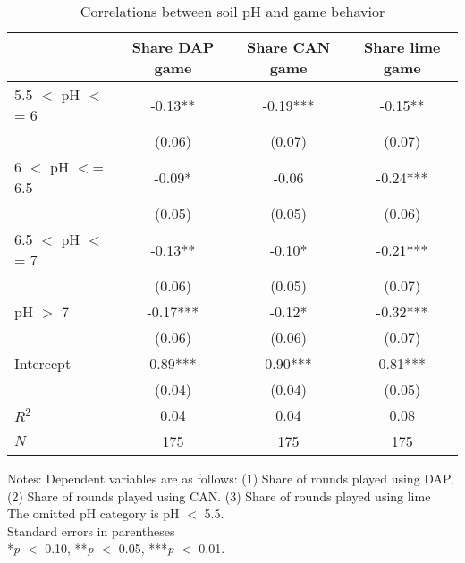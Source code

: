 \begin{table}[htbp]
\centering
\hspace*{-1.2cm}
\begin{threeparttable}
\caption{Correlations between soil pH and game behavior}
\label{tab:games_dapcanlime}
\begin{tabular}{l ccc}
\hline
\hline
                    &Share DAP game   &Share CAN game   &Share lime game   \\
\hline
5.5 $<$ pH $<$= 6       &       -0.13** &       -0.19***&       -0.15** \\
                    &      (0.06)   &      (0.07)   &      (0.07)   \\
6 $<$ pH $<$= 6.5       &       -0.09*  &       -0.06   &       -0.24***\\
                    &      (0.05)   &      (0.05)   &      (0.06)   \\
6.5 $<$ pH $<$= 7       &       -0.13** &       -0.10*  &       -0.21***\\
                    &      (0.06)   &      (0.05)   &      (0.07)   \\
pH $>$ 7              &       -0.17***&       -0.12*  &       -0.32***\\
                    &      (0.06)   &      (0.06)   &      (0.07)   \\
Intercept           &        0.89***&        0.90***&        0.81***\\
                    &      (0.04)   &      (0.04)   &      (0.05)   \\
\hline
$R^2$               &        0.04   &        0.04   &        0.08   \\
$N$                 &         175   &         175   &         175   \\
\hline
\hline
\end{tabular}
\begin{tablenotes}
\footnotesize
\item{Notes: Dependent variables are as follows: (1) Share of rounds played using DAP, (2) Share of rounds played using CAN. (3) Share of rounds played using lime\\ The omitted pH category is pH $<$ 5.5. \\ Standard errors in parentheses \\ *\textit{p} $<$ 0.10, **\textit{p} $<$ 0.05, ***\textit{p} $<$ 0.01.}
\end{tablenotes}
\end{threeparttable}
\end{table}
